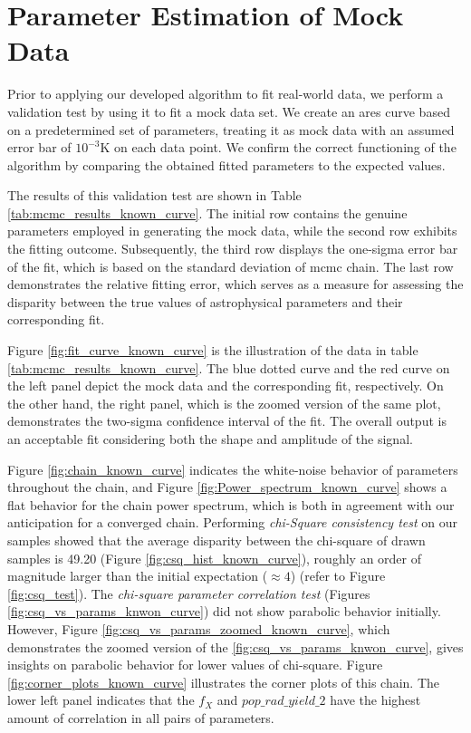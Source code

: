 \documentclass[12pt, TexShade, letterpaper]{report}
\begin{document}
\section{Parameter Estimation of Mock Data}
\label{chap:results,sub:known_curve}
Prior to applying our developed algorithm to fit real-world data, we perform a validation test by using it to fit a mock data set. We create an \gls{ares} curve based on a predetermined set of parameters, treating it as mock data with an assumed error bar of $\mathrm{10^{-3}K}$ on each data point. We confirm the correct functioning of the algorithm by comparing the obtained fitted parameters to the expected values.\par
The results of this validation test are shown in Table \ref{tab:mcmc_results_known_curve}. The initial row contains the genuine parameters employed in generating the mock data, while the second row exhibits the fitting outcome. Subsequently, the third row displays the one-sigma error bar of the fit, which is based on the standard deviation of \gls{mcmc} chain. The last row demonstrates the relative fitting error, which serves as a measure for assessing the disparity between the true values of astrophysical parameters and their corresponding fit.\par 
Figure \ref{fig:fit_curve_known_curve} is the illustration of the data in table \ref{tab:mcmc_results_known_curve}. 
The blue dotted curve and the red curve on the left panel depict the mock data and the corresponding fit, respectively.
On the other hand, the right panel, which is the zoomed version of the same plot, demonstrates the two-sigma confidence interval of the fit. The overall output is an acceptable fit considering both the shape and amplitude of the signal.\par
Figure \ref{fig:chain_known_curve} indicates the white-noise behavior of parameters throughout the chain, and Figure \ref{fig:Power_spectrum_known_curve} shows a flat behavior for the chain power spectrum, which is both in agreement with our anticipation for a converged chain. Performing \emph{chi-Square consistency test} on our samples showed that the average disparity between the chi-square of drawn samples is 49.20 (Figure \ref{fig:csq_hist_known_curve}), roughly an order of magnitude larger than the initial expectation ($\approx4$) (refer to Figure \ref{fig:csq_test}). The \emph{chi-square parameter correlation test} (Figures \ref{fig:csq_vs_params_knwon_curve}) did not show parabolic behavior initially. However, Figure \ref{fig:csq_vs_params_zoomed_known_curve}, which demonstrates the zoomed version of the \ref{fig:csq_vs_params_knwon_curve}, gives insights on parabolic behavior for lower values of chi-square. Figure \ref{fig:corner_plots_known_curve} illustrates the corner plots of this chain. The lower left panel indicates that the $f_X$ and $pop\_rad\_ yield\_2$ have the highest amount of correlation in all pairs of parameters.\par
\end{document}
